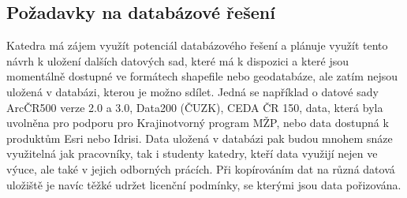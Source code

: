 \subsection{Požadavky na databázové řešení}
\label{kPozadavky}

Katedra má zájem využít potenciál databázového řešení a plánuje využít tento návrh k uložení dalších datových sad, které má k dispozici a které jsou momentálně dostupné ve formátech shapefile nebo geodatabáze, ale zatím nejsou uložená v databázi, kterou je možno sdílet. Jedná se například o datové sady ArcČR500 verze 2.0 a 3.0, Data200 (ČUZK), CEDA ČR 150, data, která byla uvolněna pro podporu pro Krajinotvorný program MŽP, nebo data dostupná k produktům Esri nebo Idrisi. Data uložená v databázi pak budou mnohem snáze využitelná jak pracovníky, tak i studenty katedry, kteří data využijí nejen ve výuce, ale také v jejich odborných prácích. Při kopírováním dat na různá datová uložiště je navíc těžké udržet licenční podmínky, se kterými jsou data pořizována. 



